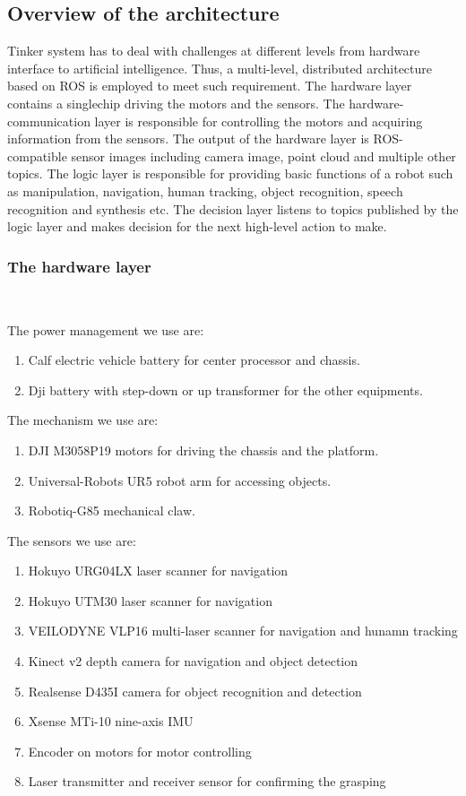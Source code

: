 \subsection{Overview of the architecture}
Tinker system has to deal with challenges at different levels from hardware interface to artificial intelligence. Thus, a multi-level, distributed architecture based on ROS is employed to meet such requirement. The hardware layer contains a singlechip driving the motors and the sensors. The hardware-communication layer is responsible for controlling the motors and acquiring information from the sensors. The output of the hardware layer is ROS-compatible sensor images including camera image, point cloud and multiple other topics. The logic layer is responsible for providing basic functions of a robot such as manipulation, navigation, human tracking, object recognition, speech recognition and synthesis etc. The decision layer listens to topics published by the logic layer and makes decision for the next high-level action to make.

\subsubsection{The hardware layer}
\ 

The power management we use are:
\begin{enumerate}
	\item Calf electric vehicle battery for center processor and chassis.
	\item Dji battery with step-down or up transformer for the other equipments.
\end{enumerate}

The mechanism we use are:
\begin{enumerate}
    \item DJI M3058P19 motors for driving the chassis and the platform.
    \item Universal-Robots UR5 robot arm for accessing objects.
    \item Robotiq-G85 mechanical claw.
\end{enumerate}

The sensors we use are:
\begin{enumerate}
    \item Hokuyo URG04LX laser scanner for navigation
    \item Hokuyo UTM30 laser scanner for navigation
    \item VEILODYNE VLP16 multi-laser scanner for navigation and hunamn tracking
    \item Kinect v2 depth camera for navigation and object detection
    \item Realsense D435I camera for object recognition and detection
    \item Xsense MTi-10 nine-axis IMU
    \item Encoder on motors for motor controlling
    \item Laser transmitter and receiver sensor for confirming the grasping
\end{enumerate}

